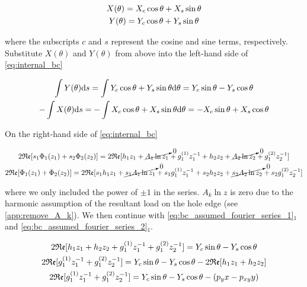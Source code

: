 \documentclass{article}
\begin{document}
\begin{gather}
    X(\theta) = X_c \cos\theta + X_s \sin\theta \notag\\
    Y(\theta) = Y_c \cos\theta + Y_s\sin\theta 
    \label{eq:assumed_fourier_series}
\end{gather}

where the subscripts $c$ and $s$ represent the cosine and sine terms, respectively. Substitute $X(\theta)$ and $Y(\theta)$ from above into the left-hand side of \cref{eq:internal_bc}

\begin{gather}
    \int{Y(\theta)} \mathrm{d}s = \int{Y_c \cos\theta + Y_s\sin\theta} \mathrm{d}\theta = Y_c \sin\theta - Y_s \cos\theta   \notag\\
    -\int{X(\theta)} \mathrm{d}s = -\int{X_c \cos\theta + X_s \sin\theta} \mathrm{d}\theta = -X_c \sin\theta + X_s \cos\theta
    \label{eq:bc_assumed_fourier_series_1}
\end{gather}

On the right-hand side of \cref{eq:internal_bc}

\begin{gather}
    2 \mathfrak{Re}[s_1 \Phi_1(z_1) + s_2 \Phi_2(z_2)] = 2 \mathfrak{Re}[h_1 z_1 + \cancelto{0}{A_1 \ln z_1} + g_1^{(1)} z_1^{-1} + h_2 z_2 + \cancelto{0}{A_2 \ln z_2} + g_1^{(2)} z_2^{-1}]  \notag\\
    2 \mathfrak{Re}[\Phi_1(z_1) + \Phi_2(z_2)] = 2 \mathfrak{Re}[s_1 h_1 z_1 + \cancelto{0}{s_1  A_1 \ln z_1} + s_1 g_1^{(1)} z_1^{-1} + s_2 h_2 z_2 + \cancelto{0}{s_2 A_2 \ln z_2} + s_2 g_1^{(2)} z_2^{-1}]
    \label{eq:bc_assumed_fourier_series_2}
\end{gather}

where we only included the power of $\pm1$ in the series. $A_k \ln z$ is zero due to the harmonic assumption of the resultant load on the hole edge (see \cref{app:remove_A_k}). We then continue with \cref{eq:bc_assumed_fourier_series_1}$_1$ and \cref{eq:bc_assumed_fourier_series_2}$_1$. 

\begin{gather}
    2 \mathfrak{Re}[h_1 z_1 + h_2 z_2 + g_1^{(1)} z_1^{-1} + g_1^{(2)} z_2^{-1}] = Y_c \sin\theta - Y_s \cos\theta \notag\\
    2 \mathfrak{Re}[g_1^{(1)} z_1^{-1} + g_1^{(2)} z_2^{-1}] = Y_c \sin\theta - Y_s \cos\theta - 2 \mathfrak{Re}[h_1 z_1 + h_2 z_2] \notag\\
    2 \mathfrak{Re}[g_1^{(1)} z_1^{-1} + g_1^{(2)} z_2^{-1}] = Y_c \sin\theta - Y_s \cos\theta - (p_y x - p_{xy} y)
    \label{eq:sol_Y_1}
\end{gather}
\end{document}
